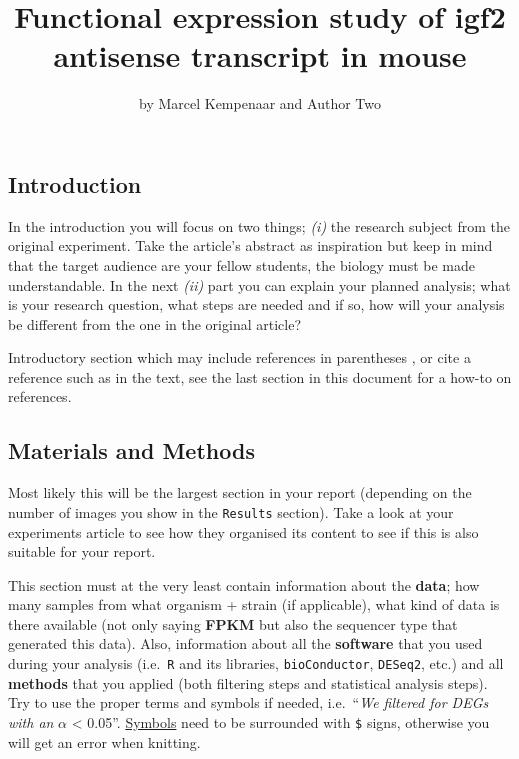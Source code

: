 \title{Functional expression study of igf2 antisense transcript in
mouse}
\author{by Marcel Kempenaar and Author Two}

\maketitle


\hypertarget{introduction}{%
\subsection{Introduction}\label{introduction}}

In the introduction you will focus on two things; \emph{(i)} the
research subject from the original experiment. Take the article's
abstract as inspiration but keep in mind that the target audience are
your fellow students, the biology must be made understandable. In the
next \emph{(ii)} part you can explain your planned analysis; what is
your research question, what steps are needed and if so, how will your
analysis be different from the one in the original article?

Introductory section which may include references in parentheses
\citep{R}, or cite a reference such as \citet{R} in the text, see the
last section in this document for a how-to on references.

\hypertarget{materials-and-methods}{%
\subsection{Materials and Methods}\label{materials-and-methods}}

Most likely this will be the largest section in your report (depending
on the number of images you show in the \texttt{Results} section). Take
a look at your experiments article to see how they organised its content
to see if this is also suitable for your report.

This section must at the very least contain information about the
\textbf{data}; how many samples from what organism + strain (if
applicable), what kind of data is there available (not only saying
\textbf{FPKM} but also the sequencer type that generated this data).
Also, information about all the \textbf{software} that you used during
your analysis (i.e.~\texttt{R} and its libraries, \texttt{bioConductor},
\texttt{DESeq2}, etc.) and all \textbf{methods} that you applied (both
filtering steps and statistical analysis steps). Try to use the proper
terms and symbols if needed, i.e.~``\emph{We filtered for DEGs with an}
\(\alpha\) \textless{} 0.05''.
\href{https://www.artofproblemsolving.com/wiki/index.php/LaTeX:Symbols}{Symbols}
need to be surrounded with \texttt{\$} signs, otherwise you will get an
error when knitting.

